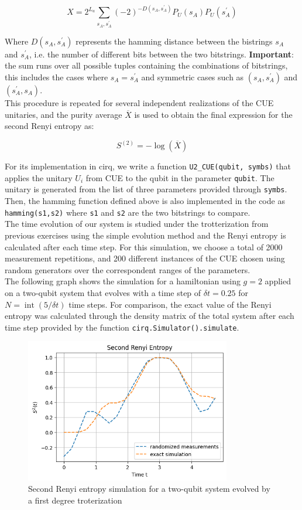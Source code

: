 \begin{equation}
    \label{eq:estimation_purity}
    X = 2^{L_a} \sum_{s_A, s^{'}_A} (-2)^{-D(s_A, s^{'}_A)} P_U(s_A) P_U(s^{'}_A)
\end{equation}

Where $D(s_A, s^{'}_A)$ represents the hamming distance between the bistrings $s_A$ and $s^{'}_A$, i.e. the number of different bits between the two bitstrings. \textbf{Important}: the sum runs over all possible tuples containing the combinations of bitstrings, this includes the cases where $s_A = s^{'}_A$ and symmetric cases such as $(s_A, s^{'}_A)$ and $(s^{'}_A, s_A)$. \\

This procedure is repeated for several independent realizations of the CUE unitaries, and the purity average $\overline{X}$ is used to obtain the final expression for the second Renyi entropy as:

\begin{equation}
    \label{eq:renyi_entropy_estimation}
    S^{(2)} = - \log(\overline{X})
\end{equation}

For its implementation in cirq, we write a function \texttt{U2\_CUE(qubit, symbs)} that applies the unitary $U_i$ from CUE to the qubit in the parameter \texttt{qubit}. The unitary is generated from the list of three parameters provided through \texttt{symbs}. Then, the hamming function defined above is also implemented in the code as \texttt{hamming(s1,s2)} where \texttt{s1} and \texttt{s2} are the two bitstrings to compare.\\

The time evolution of our system is studied under the trotterization from previous exercises using the simple evolution method and the Renyi entropy is calculated after each time step. For this simulation, we choose a total of 2000 measurement
repetitions, and 200 different instances of the CUE chosen using random generators over the correspondent ranges of the parameters.\\

The following graph shows the simulation for a hamiltonian using $g = 2$ applied on a two-qubit system that evolves  with a time step of $\delta t = 0.25$ for $N = \operatorname{int}(5/\delta t)$ time steps. For comparison, the exact value of the Renyi entropy was calculated through the density matrix of the total system after each time step provided by the function \texttt{cirq.Simulator().simulate}.

\begin{figure}[h]
    \label{fig:renyi_entropy}
    \centering
    \includegraphics[width=0.8\textwidth]{tex/figures/exercise17.png}
    \caption{Second Renyi entropy simulation for a two-qubit system evolved by a first degree troterization}
\end{figure}